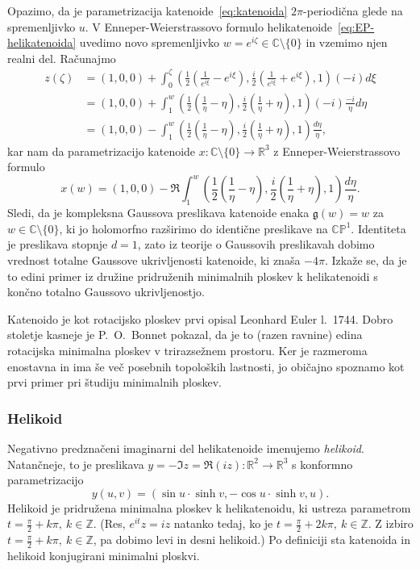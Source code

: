 \documentclass[12pt,a4paper,twoside]{article}
\theoremstyle{definition} %
\theoremstyle{plain} %
\numberwithin{equation}{section}  %
\begin{document}
Opazimo, da je parametrizacija katenoide~\eqref{eq:katenoida} $2 \pi$-periodična glede na spremenljivko $u$. V Enneper-Weierstrassovo formulo helikatenoide~\eqref{eq:EP-helikatenoida} uvedimo novo spremenljivko $w = e^{i \zeta} \in \mathbb{C} \setminus \{0\}$ in vzemimo njen realni del. Računajmo
\begin{align*}
z(\zeta) &= (1,0,0) + \int_{0}^{\zeta} \left( \frac{1}{2} \left(\frac{1}{e^{i\xi}} - e^{i\xi} \right), \frac{i}{2} \left(\frac{1}{e^{i\xi}} + e^{i\xi} \right), 1 \right) (-i) d\xi \\
	&= (1,0,0) + \int_{1}^{w} \left( \frac{1}{2} \left(\frac{1}{\eta} - \eta \right), \frac{i}{2} \left(\frac{1}{\eta} + \eta \right), 1 \right) (-i) \frac{-i}{\eta} d\eta \\
	&= (1,0,0) - \int_{1}^{w} \left( \frac{1}{2} \left(\frac{1}{\eta} - \eta \right), \frac{i}{2} \left(\frac{1}{\eta} + \eta \right), 1 \right) \frac{d\eta}{\eta},
\end{align*}
kar nam da parametrizacijo katenoide $x \colon \mathbb{C} \setminus \{0\} \to \mathbb{R}^3$ z Enneper-Weierstrassovo formulo
\begin{equation}
x(w) = (1,0,0) - \Re \int_{1}^{w} \left( \frac{1}{2} \left(\frac{1}{\eta} - \eta \right), \frac{i}{2} \left(\frac{1}{\eta} + \eta \right), 1 \right) \frac{d\eta}{\eta}.
\end{equation}
Sledi, da je kompleksna Gaussova preslikava katenoide enaka $\mathfrak{g}(w) = w$ za $w \in \mathbb{C} \setminus \{0\}$, ki jo holomorfno razširimo do identične preslikave na $\mathbb{CP}^{1}$. Identiteta je preslikava stopnje $d=1$, zato iz teorije o Gaussovih preslikavah dobimo vrednost totalne Gaussove ukrivljenosti katenoide, ki znaša $-4 \pi$. Izkaže se, da je to edini primer iz družine pridruženih minimalnih ploskev k helikatenoidi s končno totalno Gaussovo ukrivljenostjo.

Katenoido je kot rotacijsko ploskev prvi opisal Leonhard Euler l.~1744. Dobro stoletje kasneje je P.~O.~Bonnet pokazal, da je to (razen ravnine) edina rotacijska minimalna ploskev v trirazsežnem prostoru. Ker je razmeroma enostavna in ima še več posebnih topoloških lastnosti, jo običajno spoznamo kot prvi primer pri študiju minimalnih ploskev.

\subsubsection{Helikoid}
%
Negativno predznačeni imaginarni del helikatenoide imenujemo \emph{helikoid}. Natančneje, to je preslikava $y = -\Im z = \Re (iz) \colon \mathbb{R}^2 \to \mathbb{R}^3$ s konformno parametrizacijo
\begin{equation} \label{eq:helikoid}
y(u,v) = (\sin u \cdot \sinh v, -\cos u \cdot \sinh v, u).
\end{equation}
Helikoid je pridružena minimalna ploskev k helikatenoidu, ki ustreza parametrom $t = \frac{\pi}{2} + k \pi, \ k \in \mathbb{Z}$. (Res, $e^{it}z = iz$ natanko tedaj, ko je $t = \frac{\pi}{2} + 2k \pi, \ k \in \mathbb{Z}$. Z izbiro $t = \frac{\pi}{2} + k \pi, \ k \in \mathbb{Z}$, pa dobimo levi in desni helikoid.) Po definiciji sta katenoida in helikoid konjugirani minimalni ploskvi.
\end{document}
